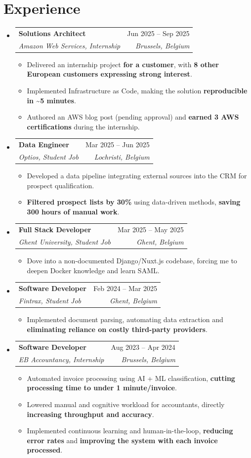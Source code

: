 \documentclass[letterpaper,11pt]{article}
\makeatletter
\newcommand{\resumeItem}[1]{
  \item\small{
    {#1 \vspace{-2pt}}
  }
}
\newcommand{\resumeSubheading}[4]{
  \vspace{-2pt}\item
    \begin{tabular*}{0.97\textwidth}[t]{l@{\extracolsep{\fill}}r}
      \textbf{#1} & #2 \\
      \textit{\small#3} & \textit{\small #4} \\
    \end{tabular*}\vspace{-7pt}
}
\newcommand{\resumeSubHeadingListStart}{\begin{itemize}[leftmargin=0.15in, label={}]}
\newcommand{\resumeSubHeadingListEnd}{\end{itemize}}
\newcommand{\resumeItemListStart}{\begin{itemize}}
\newcommand{\resumeItemListEnd}{\end{itemize}\vspace{-5pt}}
\makeatother
\begin{document}
\section{Experience}
  \resumeSubHeadingListStart
  \resumeSubheading
      {Solutions Architect}{Jun 2025 -- Sep 2025}
      {Amazon Web Services, Internship}{Brussels, Belgium}
      \resumeItemListStart
        \resumeItem{Delivered an internship project \textbf{for a customer}, with \textbf{8 other European customers expressing strong interest}.}
        \resumeItem{Implemented Infrastructure as Code, making the solution \textbf{reproducible in \textasciitilde{}5 minutes}.}
        \resumeItem{Authored an AWS blog post (pending approval) and \textbf{earned 3 AWS certifications} during the internship.}
      \resumeItemListEnd
\resumeSubheading
      {Data Engineer}{Mar 2025 -- Jun 2025}
      {Optios, Student Job}{Lochristi, Belgium}
      \resumeItemListStart
        \resumeItem{Developed a data pipeline integrating external sources into the CRM for prospect qualification.}
        \resumeItem{\textbf{Filtered prospect lists by 30\%} using data-driven methods, \textbf{saving 300 hours of manual work}.}
      \resumeItemListEnd
\resumeSubheading
      {Full Stack Developer}{Mar 2025 -- May 2025}
      {Ghent University, Student Job}{Ghent, Belgium}
      \resumeItemListStart
        \resumeItem{Dove into a non-documented Django/Nuxt.js codebase, forcing me to deepen Docker knowledge and learn SAML.}
      \resumeItemListEnd
\resumeSubheading
      {Software Developer}{Feb 2024 -- Mar 2025}
      {Fintrax, Student Job}{Ghent, Belgium}
      \resumeItemListStart
        \resumeItem{Implemented document parsing, automating data extraction and \textbf{eliminating reliance on costly third-party providers}.}
      \resumeItemListEnd
\resumeSubheading
      {Software Developer}{Aug 2023 -- Apr 2024}
      {EB Accountancy, Internship}{Brussels, Belgium}
      \resumeItemListStart
        \resumeItem{Automated invoice processing using AI + ML classification, \textbf{cutting processing time to under 1 minute/invoice}.}
        \resumeItem{Lowered manual and cognitive workload for accountants, directly \textbf{increasing throughput and accuracy}.}
        \resumeItem{Implemented continuous learning and human-in-the-loop, \textbf{reducing error rates} and \textbf{improving the system with each invoice processed}.}
      \resumeItemListEnd
  \resumeSubHeadingListEnd
\end{document}
